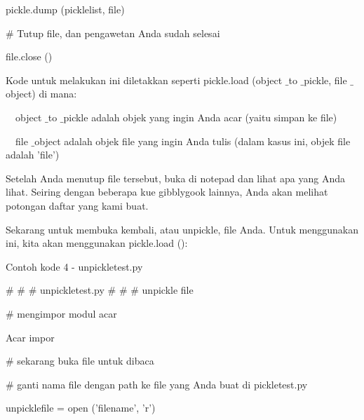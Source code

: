 \noindent 
pickle.dump (picklelist, file) \par
\noindent 
\vspace{12pt}
\noindent 
 $  \#  $ Tutup file, dan pengawetan Anda sudah selesai \par
\noindent 
file.close () \par
\vspace{14pt}
\noindent 
Kode untuk melakukan ini diletakkan seperti pickle.load (object $  \_  $to $  \_  $pickle, file $  \_  $object) di mana: \par
\noindent 
\vspace{12pt}
\noindent 
 $  $ $  $ $  $ $  $object $  \_  $to $  \_  $pickle adalah objek yang ingin Anda acar (yaitu simpan ke file) \par
\noindent 
 $  $ $  $ $  $ $  $file $  \_  $object adalah objek file yang ingin Anda tulis (dalam kasus ini, objek file adalah 'file') \par
\noindent 
\vspace{12pt}
\noindent 
Setelah Anda menutup file tersebut, buka di notepad dan lihat apa yang Anda lihat. Seiring dengan beberapa kue gibblygook lainnya, Anda akan melihat potongan daftar yang kami buat. \par
\noindent 
\vspace{12pt}
\noindent 
Sekarang untuk membuka kembali, atau unpickle, file Anda. Untuk menggunakan ini, kita akan menggunakan pickle.load (): \par
\noindent 
Contoh kode 4 - unpickletest.py \par
\noindent 
\vspace{10pt}
\noindent 
{\fontsize{10pt}{10pt}\selectfont  $  \#  $ $  \#  $ $  \#  $ unpickletest.py} 
\noindent 
{\fontsize{10pt}{10pt}\selectfont  $  \#  $ $  \#  $ $  \#  $ unpickle file} \par
\noindent 
\vspace{10pt}
\noindent 
{\fontsize{10pt}{10pt}\selectfont  $  \#  $ mengimpor modul acar} \par
\noindent 
{\fontsize{10pt}{10pt}\selectfont Acar impor} \par
\noindent 
\vspace{10pt}
\noindent 
{\fontsize{10pt}{10pt}\selectfont  $  \#  $ sekarang buka file untuk dibaca} \par
\noindent 
{\fontsize{10pt}{10pt}\selectfont  $  \#  $ ganti nama file dengan path ke file yang Anda buat di pickletest.py} \par
\noindent 
{\fontsize{10pt}{10pt}\selectfont unpicklefile = open ('filename', 'r')} \par
